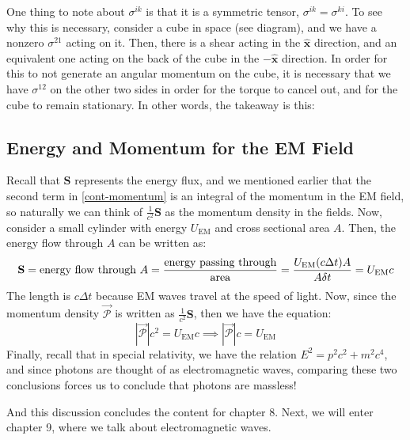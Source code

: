 One thing to note about \( \sigma^{ik} \) is that it is a symmetric tensor, \( \sigma^{ik} = \sigma^{ki} \).
To see why this is necessary, consider a cube in space (see diagram), 
and we have a nonzero \( \sigma^{21} \) acting on it. Then,
there is a shear acting in the \( \hat{\mathbf{x}} \) direction, and an equivalent one acting on the back of
the cube in the \( -\mathbf{\hat{x}} \) direction. In order for this to not generate an angular momentum on
the cube, it is necessary that we have \( \sigma^{12} \) on the other two sides in order for the torque to
cancel out, and for the cube to remain stationary. In other words, the takeaway is this:
\begin{center}
\end{center}

\subsection{Energy and Momentum for the EM Field}
Recall that \( \mathbf{S} \) represents the energy flux, and we mentioned earlier that the second term in
\ref{cont-momentum} is an integral of the momentum in the EM field, so naturally we can think of \(
\frac{1}{c^2}\mathbf{S} \) as the momentum density in the fields. Now, consider a small cylinder with energy
\( U_\text{EM} \) and cross sectional area \( A \). Then, the energy flow through \( A \) can be written as:
\[
	\mathbf{S} = \text{energy flow through \( A \)} = \frac{\text{energy passing through}}{\text{area}} =
	\frac{U_\text{EM}(c \Delta t) A}{A \delta t} = U_\text{EM} c
\] 
The length is \( c \Delta t \) because EM waves travel at the speed of light. Now, since the momentum density
\( \vec{\mathscr{P}} \) is written as \( \frac{1}{c^2}\mathbf{S} \), then we have the equation:
\[
	|\vec{\mathscr{P}}| c^2 = U_\text{EM} c \implies |\vec{\mathscr P}| c = U_\text{EM}
\]
Finally, recall that in special relativity, we have the relation \( E^2 = p^2 c^2 + m^2 c^{4} \), and since
photons are thought of as electromagnetic waves, comparing these two conclusions forces us to conclude that
photons are massless! 

And this discussion concludes the content for chapter 8. Next, we will enter chapter 9, where we talk about
electromagnetic waves.   


